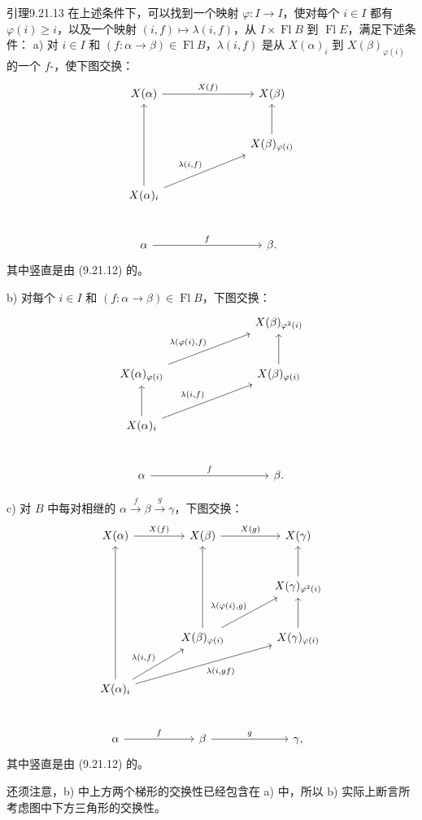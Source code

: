 \begin{SGAresult}{引理}{9.21.13}
在上述条件下，可以找到一个映射 $\varphi:I\to I$，使对每个 $i\in I$ 都有 $\varphi(i)\geq i$，以及一个映射 $(i,f)\mapsto\lambda(i,f)$，从 $I\times\operatorname{Fl}B$ 到 $\operatorname{Fl}E$，满足下述条件：
a) 对 $i\in I$ 和 $(f:\alpha\to\beta)\in\operatorname{Fl}B$，$\lambda(i,f)$ 是从 $X(\alpha)_i$ 到 $X(\beta)_{\varphi(i)}$ 的一个 $f$-，使下图交换：
\[
\begin{tikzcd}[column sep=large,row sep=large]
X(\alpha)\arrow[rr,"X(f)"] && X(\beta)\\
&&X(\beta)_{\varphi(i)}\arrow[u]\\
X(\alpha)_i\arrow[uu]\arrow[urr,"{\lambda(i,f)}"]&&\\
\alpha\arrow[rr,"f"]&&\beta .
\end{tikzcd}
\]
其中竖直是由 (9.21.12) 的。

b) 对每个 $i\in I$ 和 $(f:\alpha\to\beta)\in\operatorname{Fl}B$，下图交换：
\[
\begin{tikzcd}[column sep=large,row sep=large]
&&X(\beta)_{\varphi^2(i)}\\
X(\alpha)_{\varphi(i)}\arrow[urr,"{\lambda(\varphi(i),f)}"]&&X(\beta)_{\varphi(i)}\arrow[u]\\
X(\alpha)_i\arrow[u]\arrow[urr,"{\lambda(i,f)}"]&&\\
\alpha\arrow[rr,"f"]&&\beta .
\end{tikzcd}
\]

c) 对 $B$ 中每对相继的 $\alpha\xrightarrow{f}\beta\xrightarrow{g}\gamma$，下图交换：
\[
\begin{tikzcd}[column sep=large,row sep=large]
X(\alpha)\arrow[r,"X(f)"]&X(\beta)\arrow[r,"X(g)"]&X(\gamma)\\
&&X(\gamma)_{\varphi^2(i)}\arrow[u]\\
&X(\beta)_{\varphi(i)}\arrow[uu]\arrow[ur,"{\lambda(\varphi(i),g)}"]&X(\gamma)_{\varphi(i)}\arrow[u]\\
X(\alpha)_i\arrow[uuu]\arrow[ur,"{\lambda(i,f)}"]\arrow[urr,"{\lambda(i,gf)}"']&&\\
\alpha\arrow[r,"f"]&\beta\arrow[r,"g"]&\gamma ,
\end{tikzcd}
\]
其中竖直是由 (9.21.12) 的。
\end{SGAresult}

还须注意，b) 中上方两个梯形的交换性已经包含在 a) 中，所以 b) 实际上断言所考虑图中下方三角形的交换性。

